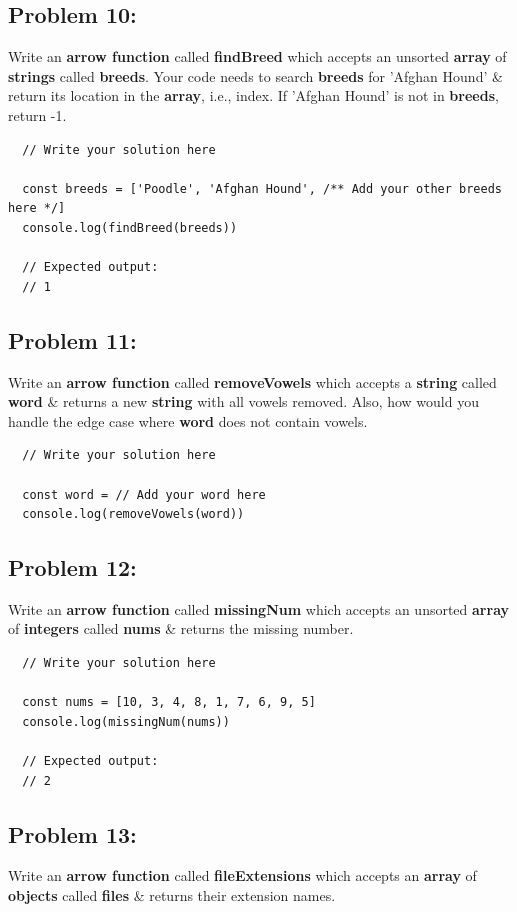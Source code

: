 \documentclass{article}
\begin{document}
\subsection*{Problem 10:} 
Write an \textbf{arrow function} called \textbf{findBreed} which accepts an unsorted \textbf{array} of \textbf{strings} called \textbf{breeds}. Your code needs to search \textbf{breeds} for 'Afghan Hound' \& return its location in the \textbf{array}, i.e., index. If 'Afghan Hound' is not in \textbf{breeds}, return -1.

\begin{verbatim}
  // Write your solution here

  const breeds = ['Poodle', 'Afghan Hound', /** Add your other breeds here */]
  console.log(findBreed(breeds)) 

  // Expected output:
  // 1
\end{verbatim}

\subsection*{Problem 11:} 
Write an \textbf{arrow function} called \textbf{removeVowels} which accepts a \textbf{string} called \textbf{word} \& returns a new \textbf{string} with all vowels removed. Also, how would you handle the edge case where \textbf{word} does not contain vowels.

\begin{verbatim}
  // Write your solution here

  const word = // Add your word here
  console.log(removeVowels(word))
\end{verbatim}

\subsection*{Problem 12:} 
Write an \textbf{arrow function} called \textbf{missingNum} which accepts an unsorted \textbf{array} of \textbf{integers} called \textbf{nums} \& returns the missing number.

\begin{verbatim}
  // Write your solution here

  const nums = [10, 3, 4, 8, 1, 7, 6, 9, 5]
  console.log(missingNum(nums))

  // Expected output:
  // 2
\end{verbatim}

\subsection*{Problem 13:}
Write an \textbf{arrow function} called \textbf{fileExtensions} which accepts an \textbf{array} of \textbf{objects} called \textbf{files} \& returns their extension names.
\end{document}
